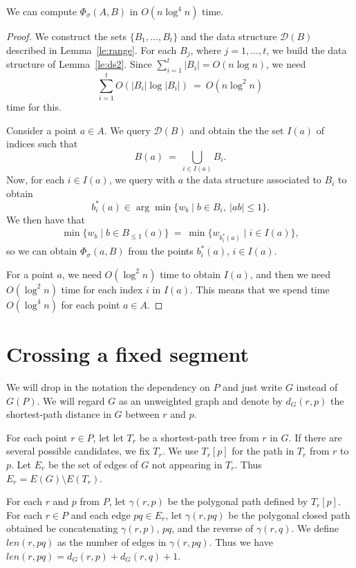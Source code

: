 \documentclass[a4paper,USenglish,numberwithinsect]{lipics}
\newcommand{\D}{\ensuremath{\mathcal{D}}}
\def\curve{\gamma}
\def\length{\mathit{len}}
\let\le\leqslant
\begin{document}
\begin{appendix}
\begin{lemma}
\label{le:accross}
	We can compute $\Phi_\sigma(A,B)$ in $O(n\log^4 n)$ time.
\end{lemma}
\begin{proof}
	We construct the sets $\{ B_1,\dots, B_t \}$ and the data structure $\D (B)$
	described in Lemma~\ref{le:range}. For each $B_j$, where $j=1,\dots , t$, 
	we build the data structure of Lemma~\ref{le:ds2}. 
	Since $\sum_{i=1}^t |B_i| = O(n\log n)$,
	we need
	\[
		\sum_{i=1}^t O(|B_i| \log |B_i|) ~=~ O(n\log^2 n)
	\]
	time for this.
	
	Consider a point $a\in A$. We query $\D (B)$ and obtain the 
	the set $I(a)$ of indices such that 
	\[
		B(a) ~=~ \bigcup_{i\in I(a)} B_i.
	\]
	Now, for each $i\in I(a)$, we query with $a$ the data structure associated 
	to $B_i$ to obtain
	\[	
		b_i^*(a) \in \arg\min \{ w_b \mid b\in B_i,~|ab|\le 1\}.
	\]
	We then have that
	\begin{align*}
		\min \{ w_b \mid b\in B_{\le 1}(a)\} ~=~ \min \{ w_{b_i^*(a)}\mid i\in I(a) \},
	\end{align*}
	so we can obtain $\Phi_\sigma(a,B)$ from the points $b_i^*(a)$, $i\in I(a)$. 
	
	For a point $a$, we need $O(\log^2 n)$ time to obtain $I(a)$,
	and then we need $O(\log^2 n)$ time for each index $i$ in $I(a)$. This means that
	we spend time $O(\log^4 n)$ for each point $a\in A$. 
\end{proof}


\section{Crossing a fixed segment}

We will drop in the notation the dependency on $P$ and just write $G$ instead of $G(P)$.
We will regard $G$ as an unweighted graph and denote by $d_G(r,p)$ the shortest-path
distance in $G$ between $r$ and $p$. 

For each point $r\in P$, let let $T_r$ be a shortest-path tree from $r$ in $G$.
If there are several possible candidates, we fix $T_r$.
We use $T_r[p]$ for the path in $T_r$ from $r$ to $p$.
Let $E_r$ be the set of edges of $G$ not appearing in $T_r$. 
Thus $E_r=E(G)\setminus E(T_r)$.

For each $r$ and $p$ from $P$, let $\curve(r,p)$ be the polygonal path
defined by $T_r[p]$.
For each $r\in P$ and each edge $pq\in E_r$, 
let $\curve(r,pq)$ be the polygonal closed path
obtained be concatenating $\curve(r,p)$, $pq$, and the reverse of $\curve(r,q)$.
We define $\length(r,pq)$ as the number of edges in $\curve(r,pq)$.
Thus we have $\length(r,pq) = d_G(r,p)+d_G(r,q)+1$.


\end{appendix}
\end{document}
